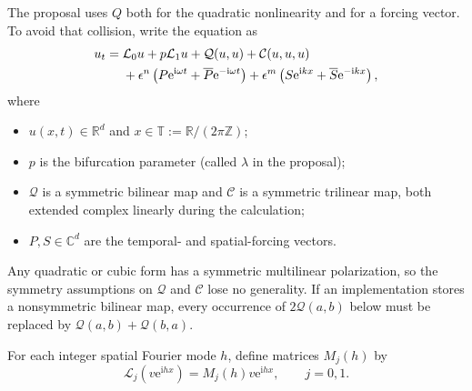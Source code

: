 \documentclass[11pt]{article}
\newcommand{\ii}{\mathrm{i}}
\newcommand{\ee}{\mathrm{e}}
\newcommand{\cQ}{\mathcal{Q}}
\newcommand{\cC}{\mathcal{C}}
\newcommand{\cL}{\mathcal{L}}
\newcommand{\T}{\mathbb{T}}
\begin{document}
The proposal uses $Q$ both for the quadratic nonlinearity and for a forcing
vector.  To avoid that collision, write the equation as
\begin{align}
  u_t={}&\cL_0u+p\cL_1u+\cQ(u,u)+\cC(u,u,u) \notag\\
       &+\epsilon^n\left(P\ee^{\ii\omega t}+\overline P\ee^{-\ii\omega t}\right)
       +\epsilon^m\left(S\ee^{\ii kx}+\overline S\ee^{-\ii kx}\right),
  \label{eq:pde}
\end{align}
where
\begin{itemize}
  \item $u(x,t)\in\mathbb{R}^d$ and $x\in\T:=\mathbb{R}/(2\pi\mathbb{Z})$;
  \item $p$ is the bifurcation parameter (called $\lambda$ in the proposal);
  \item $\cQ$ is a symmetric bilinear map and $\cC$ is a symmetric trilinear
  map, both extended complex linearly during the calculation;
  \item $P,S\in\mathbb{C}^d$ are the temporal- and spatial-forcing vectors.
\end{itemize}
Any quadratic or cubic form has a symmetric multilinear polarization, so the
symmetry assumptions on $\cQ$ and $\cC$ lose no generality.  If an implementation
stores a nonsymmetric bilinear map, every occurrence of $2\cQ(a,b)$ below must
be replaced by $\cQ(a,b)+\cQ(b,a)$.

For each integer spatial Fourier mode $h$, define matrices $M_j(h)$ by
\begin{equation}
  \cL_j\!\left(v\ee^{\ii hx}\right)
  =M_j(h)v\ee^{\ii hx},
  \qquad j=0,1.
  \label{eq:fourier-symbol}
\end{equation}
\end{document}

